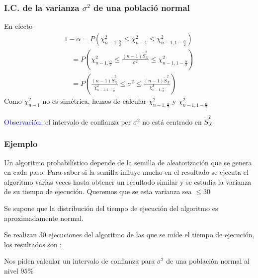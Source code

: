 \documentclass[12pt,t]{beamer}\usepackage[]{graphicx}\usepackage[]{color}
\newcommand{\blue}[1]{\textcolor{blue}{#1}}
\renewcommand{\leq}{\leqslant}
\theoremstyle{plain}
\theoremstyle{definition}
\begin{document}
\begin{frame}
\frametitle{I.C. de la varianza $\sigma^2$ de una població normal}

En efecto
$$
\begin{array}{l}
1-\alpha=P\left(\chi_{n-1,\frac{\alpha}{2}}^2\leq \chi_{n-1}^2\leq
\chi_{n-1,1-\frac{\alpha}{2}}^2\right)\\[2ex]
\quad\displaystyle =P\left(\chi_{n-1,\frac{\alpha}{2}}^2\leq \frac{(n-1) \widetilde{S}_{X}^2}{\sigma^2}\leq
\chi_{n-1,1-\frac{\alpha}{2}}^2
\right)\\[2ex]
\quad\displaystyle = P\left(\frac{(n-1)
\widetilde{S}_{X}^2}{\chi_{n-1,1-\frac{\alpha}{2}}^2}\leq\sigma^2\leq\frac{
(n-1)\widetilde{S}_{X}^2}{\chi_{n-1,\frac{\alpha}{2}}^2}
\right)
\end{array}
$$
Como $\chi_{n-1}^2$ no es simétrica, hemos de calcular $\chi_{n-1,\frac{\alpha}{2}}^2$ y $\chi_{n-1,1-\frac{\alpha}{2}}^2$
\medskip

\blue{Observación:} el intervalo de confianza  per $\sigma^2$ no está
centrado   en $\widetilde{S}_{X}^2$

\end{frame}


\begin{frame}
\frametitle{Ejemplo}

Un algoritmo probabilístico depende de la semilla de aleatorización
que se genera en cada paso. 
Para saber  si la semilla influye mucho en el resultado se ejecuta el 
algoritmo varias veces  hasta obtener un resultado similar y 
se estudia la varianza de su tiempo de ejecución. Queremos que se esta varianza sea $\leq 30$ 

Se supone  que la distribución del tiempo de ejecución del algoritmo  es 
aproximadamente normal. 
\medskip

Se realizan 30  ejecuciones del algoritmo de las que se mide el tiempo
de ejecución, los resultados son :
\medskip


Nos piden calcular un intervalo de confianza   para $\sigma^2$ de una población normal al nivel
$95\%$
\end{frame}
\end{document}
